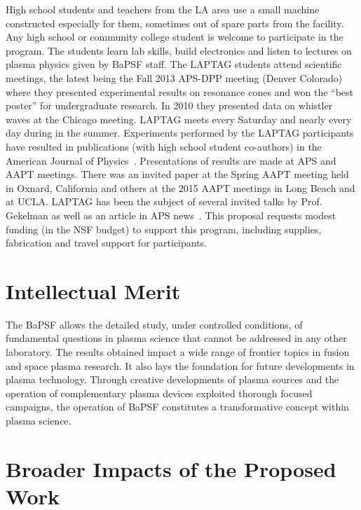 \documentclass[11pt]{article}
\renewcommand{\cite}{\citep}
\begin{document}
High school students and teachers from the LA area use a small machine
constructed especially for them, sometimes out of spare parts from
the facility.   Any high school or community college
student is welcome to participate in the program.  The students learn
lab skills, build electronics and listen to lectures on plasma physics
given by BaPSF staff. The LAPTAG students attend scientific meetings,
the latest being the Fall 2013 APS-DPP meeting (Denver Colorado) where
they presented experimental results on resonance cones and won the
``best poster'' for undergraduate research.  In 2010 they presented
data on whistler waves at the Chicago meeting.  LAPTAG meets every
Saturday and nearly every day during in the summer. Experiments
performed by the LAPTAG participants have resulted in publications
(with high school student co-authors) in the American Journal of
Physics~\cite{gekelman:2007,gekelman:2011}.  Presentations of results
are made at APS and AAPT meetings. There was an invited paper at the
Spring AAPT meeting held in Oxnard, California and others at the 2015
AAPT meetings in Long Beach and at UCLA.  LAPTAG has been the subject
of several invited talks by Prof. Gekelman as well as an article in
APS news~\cite{gekelman2002laptag}.  This proposal requests modest
funding (in the NSF budget) to support this program, including
supplies, fabrication and travel support for participants.


\section{Intellectual Merit}

The BaPSF allows the detailed study, under controlled conditions, of
fundamental questions in plasma science that cannot be addressed in any
other laboratory. The results obtained impact a wide range of frontier
topics in fusion and space plasma research. It also lays the foundation
for future developments in plasma technology. Through creative
developments of plasma sources and the operation of complementary plasma
devices exploited thorough focused campaigns, the operation of BaPSF
constitutes a transformative concept within plasma science.

\section{Broader Impacts of the Proposed Work}
\end{document}
